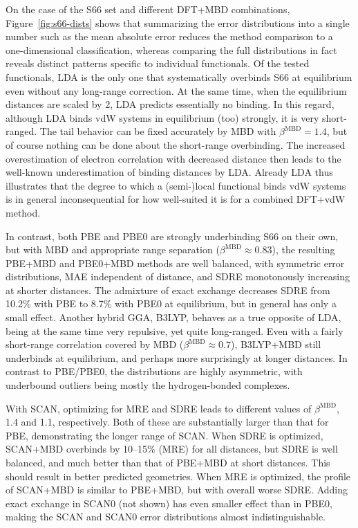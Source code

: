 On the case of the S66 set and different DFT+MBD combinations, Figure~\ref{fig:s66-dists} shows that summarizing the error distributions into a single number such as the mean absolute error reduces the method comparison to a one-dimensional classification, whereas comparing the full distributions in fact reveals distinct patterns specific to individual functionals.
Of the tested functionals, LDA is the only one that systematically overbinds S66 at equilibrium even without any long-range correction.
At the same time, when the equilibrium distances are scaled by 2, LDA predicts essentially no binding.
In this regard, although LDA binds vdW systems in equilibrium (too) strongly, it is very short-ranged.
The tail behavior can be fixed accurately by MBD with $\beta^\text{MBD}=1.4$, but of course nothing can be done about the short-range overbinding.
The increased overestimation of electron correlation with decreased distance then leads to the well-known underestimation of binding distances by LDA\@.
Already LDA thus illustrates that the degree to which a (semi-)local functional binds vdW systems is in general inconsequential for how well-suited it is for a combined DFT+vdW method. %

In contrast, both PBE and PBE0 are strongly underbinding S66 on their own, but with MBD and appropriate range separation ($\beta^\text{MBD}\approx0.83$), the resulting PBE+MBD and PBE0+MBD methods are well balanced, with symmetric error distributions, MAE independent of distance, and SDRE monotonously increasing at shorter distances.
The admixture of exact exchange decreases SDRE from 10.2\% with PBE to 8.7\% with PBE0 at equilibrium, but in general has only a small effect.
Another hybrid GGA, B3LYP, behaves as a true opposite of LDA, being at the same time very repulsive, yet quite long-ranged.
Even with a fairly short-range correlation covered by MBD ($\beta^\text{MBD}\approx0.7$), B3LYP+MBD still underbinds at equilibrium, and perhaps more surprisingly at longer distances.
In contrast to PBE/PBE0, the distributions are highly asymmetric, with underbound outliers being mostly the hydrogen-bonded complexes.

With SCAN, optimizing for MRE and SDRE leads to different values of $\beta^\text{MBD}$, 1.4 and 1.1, respectively.
Both of these are substantially larger than that for PBE, demonstrating the longer range of SCAN\@.
When SDRE is optimized, SCAN+MBD overbinds by 10--15\% (MRE) for all distances, but SDRE is well balanced, and much better than that of PBE+MBD at short distances.
This should result in better predicted geometries.
When MRE is optimized, the profile of SCAN+MBD is similar to PBE+MBD, but with overall worse SDRE\@.
Adding exact exchange in SCAN0 (not shown) has even smaller effect than in PBE0, making the SCAN and SCAN0 error distributions almost indistinguishable.

